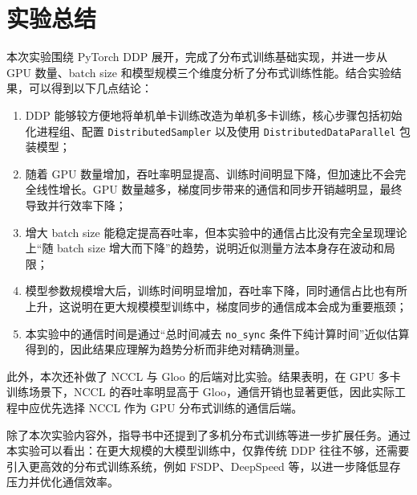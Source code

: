 \documentclass{article}
\begin{document}
\section{实验总结}
本次实验围绕 PyTorch DDP 展开，完成了分布式训练基础实现，并进一步从 GPU 数量、batch size 和模型规模三个维度分析了分布式训练性能。结合实验结果，可以得到以下几点结论：
\begin{enumerate}
  \item DDP 能够较方便地将单机单卡训练改造为单机多卡训练，核心步骤包括初始化进程组、配置 \texttt{DistributedSampler} 以及使用 \texttt{DistributedDataParallel} 包装模型；
  \item 随着 GPU 数量增加，吞吐率明显提高、训练时间明显下降，但加速比不会完全线性增长。GPU 数量越多，梯度同步带来的通信和同步开销越明显，最终导致并行效率下降；
  \item 增大 batch size 能稳定提高吞吐率，但本实验中的通信占比没有完全呈现理论上“随 batch size 增大而下降”的趋势，说明近似测量方法本身存在波动和局限；
  \item 模型参数规模增大后，训练时间明显增加，吞吐率下降，同时通信占比也有所上升，这说明在更大规模模型训练中，梯度同步的通信成本会成为重要瓶颈；
  \item 本实验中的通信时间是通过“总时间减去 \texttt{no\_sync} 条件下纯计算时间”近似估算得到的，因此结果应理解为趋势分析而非绝对精确测量。
\end{enumerate}

此外，本次还补做了 NCCL 与 Gloo 的后端对比实验。结果表明，在 GPU 多卡训练场景下，NCCL 的吞吐率明显高于 Gloo，通信开销也显著更低，因此实际工程中应优先选择 NCCL 作为 GPU 分布式训练的通信后端。

除了本次实验内容外，指导书中还提到了多机分布式训练等进一步扩展任务。通过本实验可以看出：在更大规模的大模型训练中，仅靠传统 DDP 往往不够，还需要引入更高效的分布式训练系统，例如 FSDP、DeepSpeed 等，以进一步降低显存压力并优化通信效率。
\end{document}
